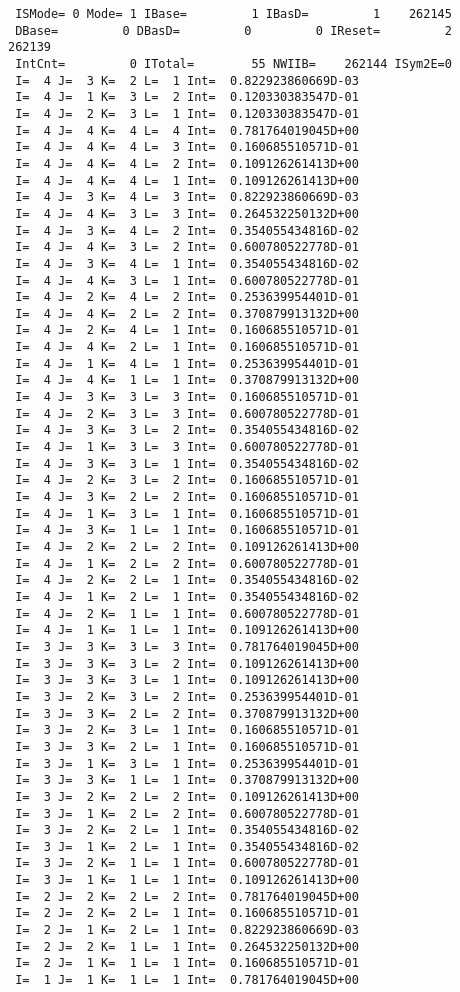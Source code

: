 \begin{verbatim}
 ISMode= 0 Mode= 1 IBase=         1 IBasD=         1    262145
 DBase=         0 DBasD=         0         0 IReset=         2    262139
 IntCnt=         0 ITotal=        55 NWIIB=    262144 ISym2E=0
 I=  4 J=  3 K=  2 L=  1 Int=  0.822923860669D-03
 I=  4 J=  1 K=  3 L=  2 Int=  0.120330383547D-01
 I=  4 J=  2 K=  3 L=  1 Int=  0.120330383547D-01
 I=  4 J=  4 K=  4 L=  4 Int=  0.781764019045D+00
 I=  4 J=  4 K=  4 L=  3 Int=  0.160685510571D-01
 I=  4 J=  4 K=  4 L=  2 Int=  0.109126261413D+00
 I=  4 J=  4 K=  4 L=  1 Int=  0.109126261413D+00
 I=  4 J=  3 K=  4 L=  3 Int=  0.822923860669D-03
 I=  4 J=  4 K=  3 L=  3 Int=  0.264532250132D+00
 I=  4 J=  3 K=  4 L=  2 Int=  0.354055434816D-02
 I=  4 J=  4 K=  3 L=  2 Int=  0.600780522778D-01
 I=  4 J=  3 K=  4 L=  1 Int=  0.354055434816D-02
 I=  4 J=  4 K=  3 L=  1 Int=  0.600780522778D-01
 I=  4 J=  2 K=  4 L=  2 Int=  0.253639954401D-01
 I=  4 J=  4 K=  2 L=  2 Int=  0.370879913132D+00
 I=  4 J=  2 K=  4 L=  1 Int=  0.160685510571D-01
 I=  4 J=  4 K=  2 L=  1 Int=  0.160685510571D-01
 I=  4 J=  1 K=  4 L=  1 Int=  0.253639954401D-01
 I=  4 J=  4 K=  1 L=  1 Int=  0.370879913132D+00
 I=  4 J=  3 K=  3 L=  3 Int=  0.160685510571D-01
 I=  4 J=  2 K=  3 L=  3 Int=  0.600780522778D-01
 I=  4 J=  3 K=  3 L=  2 Int=  0.354055434816D-02
 I=  4 J=  1 K=  3 L=  3 Int=  0.600780522778D-01
 I=  4 J=  3 K=  3 L=  1 Int=  0.354055434816D-02
 I=  4 J=  2 K=  3 L=  2 Int=  0.160685510571D-01
 I=  4 J=  3 K=  2 L=  2 Int=  0.160685510571D-01
 I=  4 J=  1 K=  3 L=  1 Int=  0.160685510571D-01
 I=  4 J=  3 K=  1 L=  1 Int=  0.160685510571D-01
 I=  4 J=  2 K=  2 L=  2 Int=  0.109126261413D+00
 I=  4 J=  1 K=  2 L=  2 Int=  0.600780522778D-01
 I=  4 J=  2 K=  2 L=  1 Int=  0.354055434816D-02
 I=  4 J=  1 K=  2 L=  1 Int=  0.354055434816D-02
 I=  4 J=  2 K=  1 L=  1 Int=  0.600780522778D-01
 I=  4 J=  1 K=  1 L=  1 Int=  0.109126261413D+00
 I=  3 J=  3 K=  3 L=  3 Int=  0.781764019045D+00
 I=  3 J=  3 K=  3 L=  2 Int=  0.109126261413D+00
 I=  3 J=  3 K=  3 L=  1 Int=  0.109126261413D+00
 I=  3 J=  2 K=  3 L=  2 Int=  0.253639954401D-01
 I=  3 J=  3 K=  2 L=  2 Int=  0.370879913132D+00
 I=  3 J=  2 K=  3 L=  1 Int=  0.160685510571D-01
 I=  3 J=  3 K=  2 L=  1 Int=  0.160685510571D-01
 I=  3 J=  1 K=  3 L=  1 Int=  0.253639954401D-01
 I=  3 J=  3 K=  1 L=  1 Int=  0.370879913132D+00
 I=  3 J=  2 K=  2 L=  2 Int=  0.109126261413D+00
 I=  3 J=  1 K=  2 L=  2 Int=  0.600780522778D-01
 I=  3 J=  2 K=  2 L=  1 Int=  0.354055434816D-02
 I=  3 J=  1 K=  2 L=  1 Int=  0.354055434816D-02
 I=  3 J=  2 K=  1 L=  1 Int=  0.600780522778D-01
 I=  3 J=  1 K=  1 L=  1 Int=  0.109126261413D+00
 I=  2 J=  2 K=  2 L=  2 Int=  0.781764019045D+00
 I=  2 J=  2 K=  2 L=  1 Int=  0.160685510571D-01
 I=  2 J=  1 K=  2 L=  1 Int=  0.822923860669D-03
 I=  2 J=  2 K=  1 L=  1 Int=  0.264532250132D+00
 I=  2 J=  1 K=  1 L=  1 Int=  0.160685510571D-01
 I=  1 J=  1 K=  1 L=  1 Int=  0.781764019045D+00
\end{verbatim}


